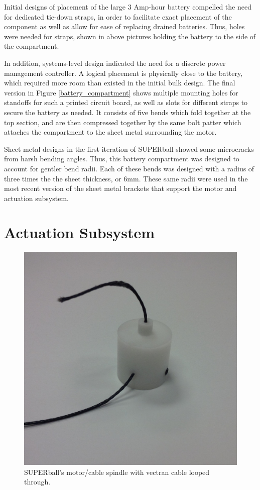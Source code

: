 \documentclass[12pt]{report}
\begin{document}
Initial designs of placement of the large 3 Amp-hour battery compelled the need for dedicated tie-down straps, in order to facilitate exact placement of the component as well as allow for ease of replacing drained batteries.
Thus, holes were needed for straps, shown in above pictures holding the battery to the side of the compartment.

In addition, systems-level design indicated the need for a discrete power management controller.
A logical placement is physically close to the battery, which required more room than existed in the initial bulk design.
The final version in Figure \ref{battery_compartment} shows multiple mounting holes for standoffs for such a printed circuit board, as well as slots for different straps to secure the battery as needed.
It consists of five bends which fold together at the top section, and are then compressed together by the same bolt patter which attaches the compartment to the sheet metal surrounding the motor.

Sheet metal designs in the first iteration of SUPERball showed some microcracks from harsh bending angles.
Thus, this battery compartment was designed to account for gentler bend radii.
Each of these bends was designed with a radius of three times the the sheet thickness, or 6mm.
These same radii were used in the most recent version of the sheet metal brackets that support the motor and actuation subsystem.

\section{Actuation Subsystem}

\begin{figure}
   \vspace{-0.5cm}
   \centering
   \includegraphics[width=0.33\columnwidth]{img/spindle} 
   \caption{SUPERball's motor/cable spindle with vectran cable looped through.~\cite{sabelhaus2014hardware}}
   \label{spindle_pic}
   \vspace{-0.6cm}
\end{figure}
\end{document}
